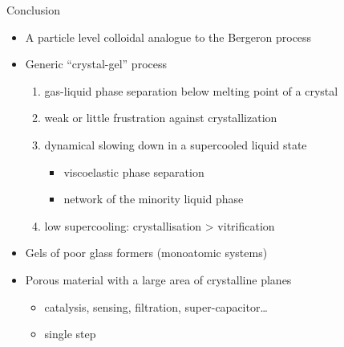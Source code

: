 \documentclass[xcolor=table]{beamer}
\begin{document}
\begin{frame}{Conclusion}
	\begin{itemize}
		\item A particle level colloidal analogue to the Bergeron process
		\item Generic ``crystal-gel'' process
		\begin{enumerate}
			\item gas-liquid phase separation below melting point
		of a crystal
			\item weak or little frustration against crystallization
			\item dynamical slowing down in a supercooled liquid state
			\begin{itemize}
				\item viscoelastic phase separation
				\item network of the minority liquid phase
			\end{itemize}
			\item low supercooling: crystallisation > vitrification
		\end{enumerate}
		\item Gels of poor glass formers (monoatomic systems)
		\item Porous material with a large area of crystalline planes
		\begin{itemize}
			\item catalysis, sensing, filtration, super-capacitor\ldots
			\item single step
		\end{itemize}
	\end{itemize}
\end{frame}

\appendix
{}
\setcounter{finalframe}{\value{framenumber}}

\begin{frame}[plain]
\end{frame}
\end{document}
